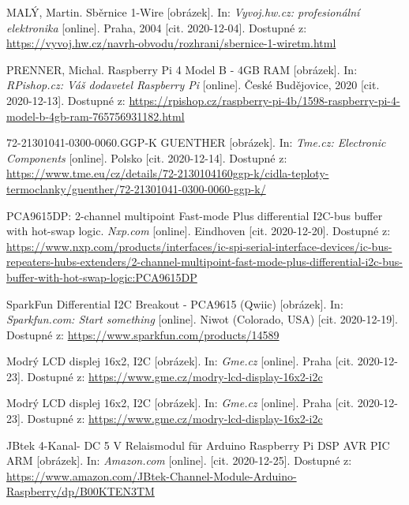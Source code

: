 \begin{thebibliography}{3}
MALÝ, Martin. Sběrnice 1-Wire [obrázek]. In: \textit{Vyvoj.hw.cz: profesionální elektronika} [online]. Praha, 2004 [cit. 2020-12-04]. Dostupné z: \url{https://vyvoj.hw.cz/navrh-obvodu/rozhrani/sbernice-1-wiretm.html}


PRENNER, Michal. Raspberry Pi 4 Model B - 4GB RAM [obrázek]. In: \textit{RPishop.cz: Váš dodavetel Raspberry Pi} [online]. České Budějovice, 2020 [cit. 2020-12-13]. Dostupné z: \url{https://rpishop.cz/raspberry-pi-4b/1598-raspberry-pi-4-model-b-4gb-ram-765756931182.html}

72-21301041-0300-0060.GGP-K GUENTHER [obrázek]. In: \textit{Tme.cz: Electronic Components} [online]. Polsko [cit. 2020-12-14]. Dostupné z: \url{https://www.tme.eu/cz/details/72-2130104160ggp-k/cidla-teploty-termoclanky/guenther/72-21301041-0300-0060-ggp-k/}

PCA9615DP: 2-channel multipoint Fast-mode Plus differential I2C-bus buffer with hot-swap logic. \textit{Nxp.com} [online]. Eindhoven [cit. 2020-12-20]. Dostupné z: \url{https://www.nxp.com/products/interfaces/ic-spi-serial-interface-devices/ic-bus-repeaters-hubs-extenders/2-channel-multipoint-fast-mode-plus-differential-i2c-bus-buffer-with-hot-swap-logic:PCA9615DP}

SparkFun Differential I2C Breakout - PCA9615 (Qwiic) [obrázek]. In: \textit{Sparkfun.com: Start something} [online]. Niwot (Colorado, USA) [cit. 2020-12-19]. Dostupné z: \url{https://www.sparkfun.com/products/14589}

Modrý LCD displej 16x2, I2C [obrázek]. In: \textit{Gme.cz} [online]. Praha [cit. 2020-12-23]. Dostupné z: \url{https://www.gme.cz/modry-lcd-display-16x2-i2c}

Modrý LCD displej 16x2, I2C [obrázek]. In: \textit{Gme.cz} [online]. Praha [cit. 2020-12-23]. Dostupné z: \url{https://www.gme.cz/modry-lcd-display-16x2-i2c}

JBtek 4-Kanal- DC 5 V Relaismodul für Arduino Raspberry Pi DSP AVR PIC ARM [obrázek]. In: \textit{Amazon.com} [online]. [cit. 2020-12-25]. Dostupné z: \url{https://www.amazon.com/JBtek-Channel-Module-Arduino-Raspberry/dp/B00KTEN3TM}


\end{thebibliography}
